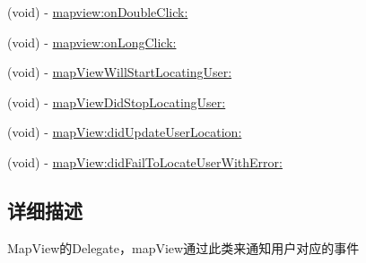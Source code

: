 \begin{DoxyCompactItemize}
\item 
(void) -\/ \hyperlink{protocol_b_m_k_map_view_delegate-p_a957fb04d2fb88bd0e45ad9d712c1e85f}{mapview\-:on\-Double\-Click\-:}
\item 
(void) -\/ \hyperlink{protocol_b_m_k_map_view_delegate-p_abdef3e78c6a4d51665bc859e16c629a4}{mapview\-:on\-Long\-Click\-:}
\item 
(void) -\/ \hyperlink{protocol_b_m_k_map_view_delegate-p_a2265718129af225330d0d5f350f45dd2}{map\-View\-Will\-Start\-Locating\-User\-:}
\item 
(void) -\/ \hyperlink{protocol_b_m_k_map_view_delegate-p_aac6507cc2dea1a2a7c2df80d08b42102}{map\-View\-Did\-Stop\-Locating\-User\-:}
\item 
(void) -\/ \hyperlink{protocol_b_m_k_map_view_delegate-p_a85fe7a69fc1924412e6a97d259157ab3}{map\-View\-:did\-Update\-User\-Location\-:}
\item 
(void) -\/ \hyperlink{protocol_b_m_k_map_view_delegate-p_a09254d3d99fa4c5777c646725b029966}{map\-View\-:did\-Fail\-To\-Locate\-User\-With\-Error\-:}
\end{DoxyCompactItemize}


\subsection{详细描述}
Map\-View的\-Delegate，map\-View通过此类来通知用户对应的事件 

